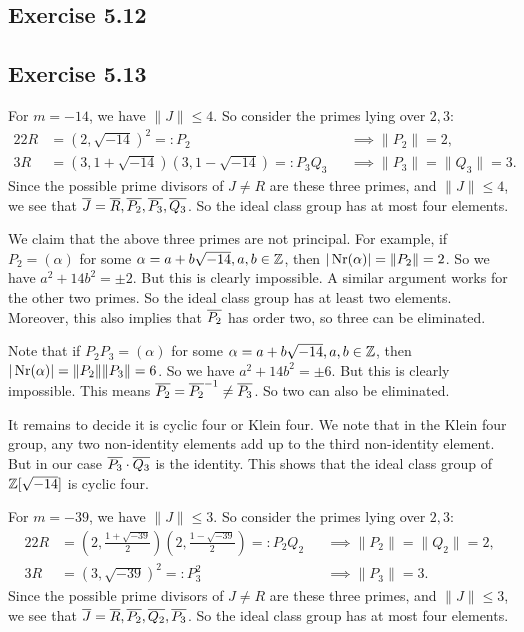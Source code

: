 \documentclass[../Marcus.tex]{subfiles}
\begin{document}
\subsection*{Exercise 5.12}

\subsection*{Exercise 5.13}

For $m=-14$, we have $\|J\| \leq 4$. So consider the primes lying over $2,3$:
\begin{alignat*}{2}
2R &= (2,\sqrt{-14})^2 =: P_2  &&\implies \|P_2\| = 2,      \\
3R &= (3,1+\sqrt{-14})(3,1-\sqrt{-14}) =: P_3Q_3    &&\implies \|P_3\| = \|Q_3\| = 3.
\end{alignat*}
Since the possible prime divisors of $J\neq R$ are these three primes, and $\|J\| \leq 4$, we see that $\overline{J}=\overline{R},\overline{P_2},\overline{P_3},\overline{Q_3}$. So the ideal class group has at most four elements. 

We claim that the above three primes are not principal. For example, if $P_2 = (\alpha)$ for some $\alpha=a+b\sqrt{-14},a,b\in \mathbb{Z}$, then $|\operatorname{Nr}(\alpha)| = \|P_2\| = 2$. So we have $a^2+14b^2 = \pm2$. But this is clearly impossible. A similar argument works for the other two primes. So the ideal class group has at least two elements. Moreover, this also implies that $\overline{P_2}$ has order two, so three can be eliminated.

Note that if $P_2P_3 = (\alpha)$ for some $\alpha=a+b\sqrt{-14},a,b\in \mathbb{Z}$, then $|\operatorname{Nr}(\alpha)| = \|P_2\|\|P_3\| = 6$. So we have $a^2+14b^2 = \pm6$. But this is clearly impossible. This means $\overline{P_2} = \overline{P_2}^{-1} \neq \overline{P_3}$. So two can also be eliminated.

It remains to decide it is cyclic four or Klein four. We note that in the Klein four group, any two non-identity elements add up to the third non-identity element. But in our case $\overline{P_3} \cdot \overline{Q_3}$ is the identity. This shows that the ideal class group of $\mathbb{Z}[\sqrt{-14}]$ is cyclic four.

For $m=-39$, we have $\|J\| \leq 3$. So consider the primes lying over $2,3$:
\begin{alignat*}{2}
2R &= \left(2,\frac{1+\sqrt{-39}}{2}\right) \left(2,\frac{1-\sqrt{-39}}{2}\right)  =: P_2Q_2  &&\implies \|P_2\| = \|Q_2\| = 2,     \\
3R &= (3,\sqrt{-39})^2 =: P_3^2  &&\implies \|P_3\| = 3.
\end{alignat*}
Since the possible prime divisors of $J\neq R$ are these three primes, and $\|J\| \leq 3$, we see that $\overline{J}=\overline{R},\overline{P_2},\overline{Q_2},\overline{P_3}$. So the ideal class group has at most four elements.
\end{document}
